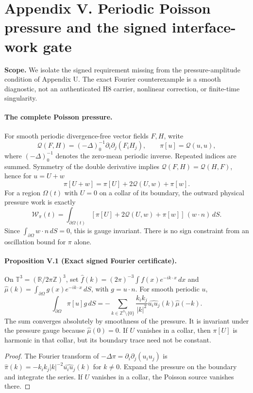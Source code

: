 \clearpage
\section*{Appendix V. Periodic Poisson pressure and the signed interface-work gate}
\noindent\textbf{Scope.} We isolate the signed requirement missing from the pressure-amplitude condition of Appendix U. The exact Fourier counterexample is a smooth diagnostic, not an authenticated H8 carrier, nonlinear correction, or finite-time singularity.

\paragraph{The complete Poisson pressure.}
For smooth periodic divergence-free vector fields $F,H$, write
\[
 \mathcal Q(F,H)=(-\Delta)^{-1}_0\partial_i\partial_j(F_iH_j),
 \qquad \pi[u]=\mathcal Q(u,u),
\]
where $(-\Delta)^{-1}_0$ denotes the zero-mean periodic inverse. Repeated indices are summed. Symmetry of the double derivative implies $\mathcal Q(F,H)=\mathcal Q(H,F)$, hence for $u=U+w$
\begin{equation}\label{eq:V-polarization}
 \boxed{\pi[U+w]=\pi[U]+2\mathcal Q(U,w)+\pi[w].}
\end{equation}
For a region $\Omega(t)$ with $U=0$ on a collar of its boundary, the outward physical pressure work is exactly
\begin{equation}\label{eq:V-pressurework}
 \boxed{\mathcal W_\pi(t)=\int_{\partial\Omega(t)}
 [\pi[U]+2\mathcal Q(U,w)+\pi[w]]\, (w\cdot n)\,dS.}
\end{equation}
Since $\int_{\partial\Omega}w\cdot n\,dS=0$, this is gauge invariant. There is no sign constraint from an oscillation bound for $\pi$ alone.

\paragraph{Proposition V.1 (Exact signed Fourier certificate).}
On $\mathbb T^3=(\mathbb R/2\pi\mathbb Z)^3$, set
$\widehat f(k)=(2\pi)^{-3}\int f(x)e^{-ik\cdot x}\,dx$
and $\widehat\mu(k)=\int_{\partial\Omega}g(x)e^{-ik\cdot x}\,dS$,
with $g=u\cdot n$. For smooth periodic $u$,
\begin{equation}\label{eq:V-Fourier}
 \boxed{\int_{\partial\Omega}\pi[u]g\,dS
 =-\sum_{k\in\mathbb Z^3\setminus\{0\}}
 \frac{k_i k_j}{|k|^2}\widehat{u_i u_j}(k)\widehat\mu(-k).}
\end{equation}
The sum converges absolutely by smoothness of the pressure. It is invariant under the pressure gauge because $\widehat\mu(0)=0$. If $U$ vanishes in a collar, then $\pi[U]$ is harmonic in that collar, but its boundary trace need not be constant.
\begin{proof}
The Fourier transform of $-\Delta\pi=\partial_i\partial_j(u_i u_j)$ is
$\widehat\pi(k)=-k_i k_j|k|^{-2}\widehat{u_i u_j}(k)$ for $k\ne0$.
Expand the pressure on the boundary and integrate the series. If $U$
vanishes in a collar, the Poisson source vanishes there. 
\end{proof}

